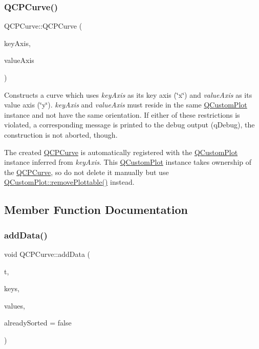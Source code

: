 \subsubsection{\texorpdfstring{Q\+C\+P\+Curve()}{QCPCurve()}}
{\footnotesize\ttfamily Q\+C\+P\+Curve\+::\+Q\+C\+P\+Curve (\begin{DoxyParamCaption}\item[{\hyperlink{class_q_c_p_axis}{Q\+C\+P\+Axis} $\ast$}]{key\+Axis,  }\item[{\hyperlink{class_q_c_p_axis}{Q\+C\+P\+Axis} $\ast$}]{value\+Axis }\end{DoxyParamCaption})\hspace{0.3cm}{\ttfamily [explicit]}}

Constructs a curve which uses {\itshape key\+Axis} as its key axis (\char`\"{}x\char`\"{}) and {\itshape value\+Axis} as its value axis (\char`\"{}y\char`\"{}). {\itshape key\+Axis} and {\itshape value\+Axis} must reside in the same \hyperlink{class_q_custom_plot}{Q\+Custom\+Plot} instance and not have the same orientation. If either of these restrictions is violated, a corresponding message is printed to the debug output (q\+Debug), the construction is not aborted, though.

The created \hyperlink{class_q_c_p_curve}{Q\+C\+P\+Curve} is automatically registered with the \hyperlink{class_q_custom_plot}{Q\+Custom\+Plot} instance inferred from {\itshape key\+Axis}. This \hyperlink{class_q_custom_plot}{Q\+Custom\+Plot} instance takes ownership of the \hyperlink{class_q_c_p_curve}{Q\+C\+P\+Curve}, so do not delete it manually but use \hyperlink{class_q_custom_plot_af3dafd56884208474f311d6226513ab2}{Q\+Custom\+Plot\+::remove\+Plottable()} instead. 

\subsection{Member Function Documentation}
\mbox{\label{class_q_c_p_curve_a73edf394b94f3f24f07518e30565a07f}} 
\subsubsection{\texorpdfstring{add\+Data()}{addData()}\hspace{0.1cm}{\footnotesize\ttfamily [1/4]}}
{\footnotesize\ttfamily void Q\+C\+P\+Curve\+::add\+Data (\begin{DoxyParamCaption}\item[{const Q\+Vector$<$ double $>$ \&}]{t,  }\item[{const Q\+Vector$<$ double $>$ \&}]{keys,  }\item[{const Q\+Vector$<$ double $>$ \&}]{values,  }\item[{bool}]{already\+Sorted = {\ttfamily false} }\end{DoxyParamCaption})}

